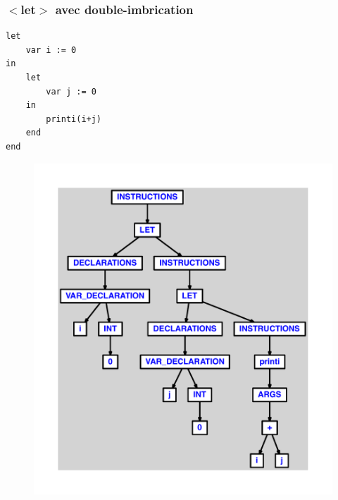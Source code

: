 \documentclass{article}
\begin{document}
\subsubsection{$ < $let$ > $ avec double-imbrication}
\begin{lstlisting}
let
	var i := 0
in
	let
		var j := 0
	in
		printi(i+j)
	end
end
\end{lstlisting}
\newpage
\begin{figure}[H]
\centering
\includegraphics[max width=\textwidth]{ast/ast_279.pdf}
\end{figure}
\newpage
\end{document}
